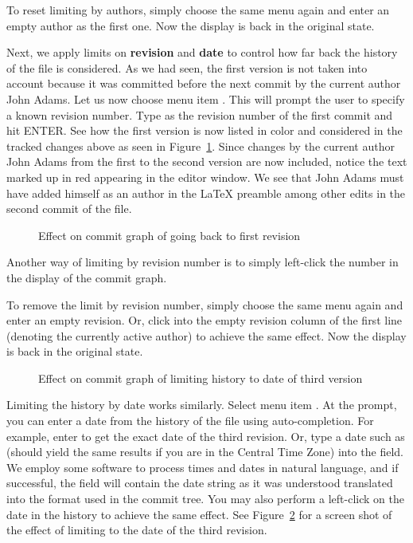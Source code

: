 To reset limiting by authors, simply choose the same menu  again and enter an empty author as the first one.  Now the display is back in the original state.

Next, we apply limits on \textbf{revision} and \textbf{date} to control how far back the history of the file is considered.  As we had seen, the first version is not taken into account because it was committed before the next commit by the current author John Adams.  Let us now choose menu item .  This will prompt the user to specify a known revision number.  Type  as the revision number of the first commit and hit ENTER.  See how the first version is now listed in color and considered in the tracked changes above as seen in Figure~\ref{fig:svn-emacs-limit-rev}.  Since changes by the current author John Adams from the first to the second version are now included, notice the text marked up in red appearing in the editor window. We see that John Adams must have added himself as an author in the LaTeX preamble among other edits in the second commit of the file. 

\begin{figure}
\centering
{}
\caption{Effect on commit graph of going back to first revision} \label{fig:svn-emacs-limit-rev}
\end{figure}

Another way of limiting by revision number is to simply left-click the number in the display of the commit graph.  

To remove the limit by revision number, simply choose the same menu  again and enter an empty revision. Or, click into the empty revision column of the first line (denoting the currently active author) to achieve the same effect.  Now the display is back in the original state.

\begin{figure}
\centering
{}
\caption{Effect on commit graph of limiting history to date of third version} \label{fig:svn-emacs-limit-date}
\end{figure}

Limiting the history by date works similarly.  Select menu item . At the prompt, you can enter a date from the history of the file using auto-completion.  For example, enter  to get the exact date of the third revision.  Or, type a date such as  (should yield the same results if you are in the Central Time Zone) into the field.  We employ some software to process times and dates in natural language, and if successful, the field will contain the date string as it was understood translated into the format used in the commit tree. You may also perform a left-click on the date in the history to achieve the same effect.  See Figure~\ref{fig:svn-emacs-limit-date} for a screen shot of the effect of limiting to the date of the third revision. 

